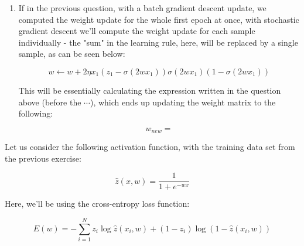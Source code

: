 \documentclass[12pt]{article}
\begin{document}
\begin{enumerate}[leftmargin=\labelsep]
\begin{enumerate}
{      \begin{align*}
        w &\leftarrow w + 2 \eta \sum_{i=1}^N x_i (z_i - \sigma(2wx_i)) \sigma(2wx_i) (1 - \sigma(2wx_i))) \\
        & \leftarrow  + 2 \cdot 1 \cdot
        \left(
           \cdot \left(
            1 - \sigma(2 \cdot  \cdot )
          \right) \cdot \sigma(2 \cdot  \cdot ) \cdot
          \left(1 - \sigma(2 \cdot  \cdot )\right)
        \right) + \cdots = 
      \end{align*}

    }
    \item {
      If in the previous question, with a batch gradient descent update, we
      computed the weight update for the whole first epoch at once, with
      stochastic gradient descent we'll compute the weight update for each
      sample individually - the "sum" in the learning rule, here, will be replaced
      by a single sample, as can be seen below:

      $$
        w \leftarrow w + 2\eta x_1 (z_1 - \sigma(2wx_1)) \sigma(2wx_1) (1 - \sigma(2wx_1))
      $$

      This will be essentially calculating the expression written in the question above
      (before the $\cdots$), which ends up updating the weight matrix to the following:

      $$
        w_{new} = 
      $$
    }
  \end{enumerate}

  \begin{tcolorbox}[enhanced jigsaw,colback=bg,boxrule=0pt,arc=1pt,halign=center]
    \item Let us consider the following activation function, with the training data set
    from the previous exercise:

    \begin{equation*}
      \hat{z}(x, w) = \frac{1}{1 + e^{-w x}}
    \end{equation*}

    Here, we'll be using the cross-entropy loss function:

    \begin{equation*}
      E(w) = - \sum_{i=1}^N z_i \log \hat{z}(x_i, w) + (1 - z_i) \log (1 - \hat{z}(x_i, w))
    \end{equation*}


\end{tcolorbox}
\end{enumerate}
\end{document}

